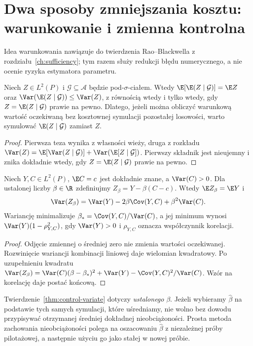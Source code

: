 \section{Dwa sposoby zmniejszania kosztu: warunkowanie i zmienna kontrolna}
Idea warunkowania nawiązuje do twierdzenia Rao--Blackwella z rozdziału~\ref{ch:sufficiency}; tym razem służy redukcji błędu numerycznego, a nie ocenie ryzyka estymatora parametru.
\begin{twierdzenie}
\label{thm:mc-rao-blackwell}
Niech $Z\in L^2(P)$ i $\mathcal G\subseteq\mathcal A$ będzie
pod-$\sigma$-ciałem. Wtedy
$\E[\E(Z\mid\mathcal G)]=\E Z$ oraz
$\Var(\E(Z\mid\mathcal G))\le\Var(Z)$,
z równością wtedy i tylko wtedy, gdy
$Z=\E(Z\mid\mathcal G)$ prawie na pewno.
Dlatego, jeżeli można obliczyć warunkową wartość oczekiwaną
bez kosztownej symulacji pozostałej losowości, warto symulować
$\E(Z\mid\mathcal G)$ zamiast $Z$.
\end{twierdzenie}
\begin{proof}
Pierwsza teza wynika z własności wieży, druga z rozkładu
$\Var(Z)=\E[\Var(Z\mid\mathcal G)]
 +\Var(\E[Z\mid\mathcal G])$.
Pierwszy składnik jest nieujemny i znika dokładnie wtedy,
gdy $Z=\E(Z\mid\mathcal G)$ prawie na pewno.
\end{proof}

\begin{twierdzenie}
\label{thm:control-variate}
Niech $Y,C\in L^2(P)$, $\E C=c$ jest dokładnie znane,
a $\Var(C)>0$. Dla ustalonej liczby $\beta\in\R$
zdefiniujmy $Z_\beta=Y-\beta(C-c)$.
Wtedy $\E Z_\beta=\E Y$ i
\[
 \Var(Z_\beta)=\Var(Y)-2\beta\Cov(Y,C)
                      +\beta^2\Var(C).
\]
Wariancję minimalizuje
$\beta_*=\Cov(Y,C)/\Var(C)$, a jej minimum wynosi
$\Var(Y)(1-\rho_{Y,C}^2)$, gdy $\Var(Y)>0$ i
$\rho_{Y,C}$ oznacza współczynnik korelacji.
\end{twierdzenie}
\begin{proof}
Odjęcie zmiennej o średniej zero nie zmienia wartości oczekiwanej.
Rozwinięcie wariancji kombinacji liniowej daje wielomian kwadratowy.
Po uzupełnieniu kwadratu
$\Var(Z_\beta)=\Var(C)(\beta-\beta_*)^2+
\Var(Y)-\Cov(Y,C)^2/\Var(C)$.
Wzór na korelację daje postać końcową.
\end{proof}

\begin{uwaga}
Twierdzenie~\ref{thm:control-variate} dotyczy \emph{ustalonego}
$\beta$. Jeżeli wybieramy $\widehat\beta$ na podstawie tych
samych symulacji, które uśredniamy, nie wolno bez dowodu
przypisywać otrzymanej średniej dokładnej nieobciążoności.
Prosta metoda zachowania nieobciążoności polega na oszacowaniu
$\widehat\beta$ z niezależnej próby pilotażowej, a następnie
użyciu go jako stałej w nowej próbie.
\end{uwaga}

